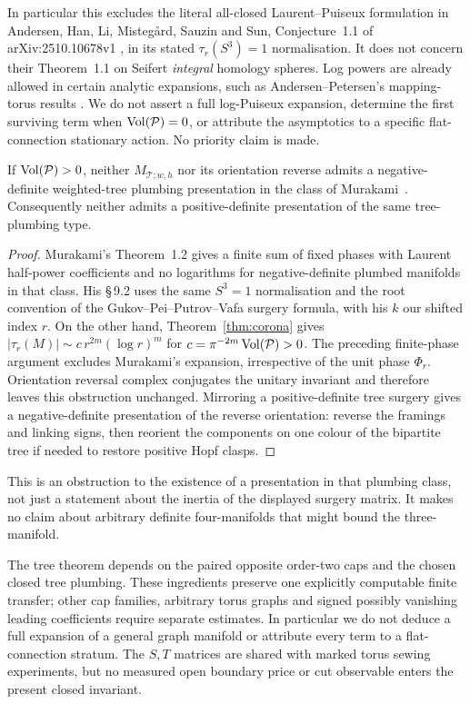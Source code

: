 In particular this excludes the literal all-closed Laurent--Puiseux formulation in Andersen, Han, Li, Misteg\aa rd, Sauzin and Sun, Conjecture~1.1 of arXiv:2510.10678v1 \cite{AHLMS}, in its stated \(\tau_r(S^3)=1\) normalisation. It does not concern their Theorem~1.1 on Seifert \emph{integral} homology spheres. Log powers are already allowed in certain analytic expansions, such as Andersen--Petersen's mapping-torus results \cite[Theorems~1.3 and 3.4]{AP}. We do not assert a full log-Puiseux expansion, determine the first surviving term when \(\operatorname{Vol}(\mathcal P)=0\), or attribute the asymptotics to a specific flat-connection stationary action. No priority claim is made.


\begin{corollary}\label{cor:definite}
If \(\operatorname{Vol}(\mathcal P)>0\), neither \(M_{\mathcal T;w,h}\) nor its orientation reverse admits a negative-definite weighted-tree plumbing presentation in the class of Murakami~\cite[Theorem~1.2 and \S\S\,9.1--9.3]{Murakami}. Consequently neither admits a positive-definite presentation of the same tree-plumbing type.
\end{corollary}
\begin{proof}
Murakami's Theorem~1.2 gives a finite sum of fixed phases with Laurent half-power coefficients and no logarithms for negative-definite plumbed manifolds in that class. His \S\,9.2 uses the same \(S^3=1\) normalisation and the root convention of the Gukov--Pei--Putrov--Vafa surgery formula, with his \(k\) our shifted index \(r\). On the other hand, Theorem~\ref{thm:corona} gives \(|\tau_r(M)|\sim c\,r^{2m}(\log r)^m\) for \(c=\pi^{-2m}\operatorname{Vol}(\mathcal P)>0\). The preceding finite-phase argument excludes Murakami's expansion, irrespective of the unit phase \(\Phi_r\). Orientation reversal complex conjugates the unitary invariant and therefore leaves this obstruction unchanged. Mirroring a positive-definite tree surgery gives a negative-definite presentation of the reverse orientation: reverse the framings and linking signs, then reorient the components on one colour of the bipartite tree if needed to restore positive Hopf clasps.
\end{proof}
This is an obstruction to the existence of a presentation in that plumbing class, not just a statement about the inertia of the displayed surgery matrix. It makes no claim about arbitrary definite four-manifolds that might bound the three-manifold.

The tree theorem depends on the paired opposite order-two caps and the chosen closed tree plumbing. These ingredients preserve one explicitly computable finite transfer; other cap families, arbitrary torus graphs and signed possibly vanishing leading coefficients require separate estimates. In particular we do not deduce a full expansion of a general graph manifold or attribute every term to a flat-connection stratum. The \(S,T\) matrices are shared with marked torus sewing experiments, but no measured open boundary price or cut observable enters the present closed invariant.
